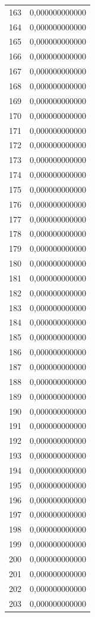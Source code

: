 \begin{tabular}{lr}
163 & 0,000000000000 \\
164 & 0,000000000000 \\
165 & 0,000000000000 \\
166 & 0,000000000000 \\
167 & 0,000000000000 \\
168 & 0,000000000000 \\
169 & 0,000000000000 \\
170 & 0,000000000000 \\
171 & 0,000000000000 \\
172 & 0,000000000000 \\
173 & 0,000000000000 \\
174 & 0,000000000000 \\
175 & 0,000000000000 \\
176 & 0,000000000000 \\
177 & 0,000000000000 \\
178 & 0,000000000000 \\
179 & 0,000000000000 \\
180 & 0,000000000000 \\
181 & 0,000000000000 \\
182 & 0,000000000000 \\
183 & 0,000000000000 \\
184 & 0,000000000000 \\
185 & 0,000000000000 \\
186 & 0,000000000000 \\
187 & 0,000000000000 \\
188 & 0,000000000000 \\
189 & 0,000000000000 \\
190 & 0,000000000000 \\
191 & 0,000000000000 \\
192 & 0,000000000000 \\
193 & 0,000000000000 \\
194 & 0,000000000000 \\
195 & 0,000000000000 \\
196 & 0,000000000000 \\
197 & 0,000000000000 \\
198 & 0,000000000000 \\
199 & 0,000000000000 \\
200 & 0,000000000000 \\
201 & 0,000000000000 \\
202 & 0,000000000000 \\
203 & 0,000000000000 \\

\end{tabular}
